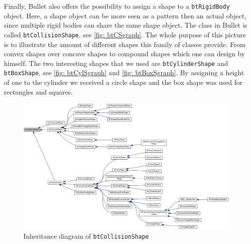 Finally, Bullet also offers the possibility to assign a shape to a \texttt{btRigidBody} object. Here, a shape object can be more seen as a pattern then an actual object, since multiple rigid bodies can share the same shape object. The class in Bullet is called \texttt{btCollisionShape}, see \autoref{fig: btCSgraph}. The whole purpose of this picture is to illustrate the amount of different shapes this family of classes provide. From convex shapes over concave shapes to compound shapes which one can design by himself. The two interesting shapes that we used are \texttt{btCylinderShape} and \texttt{btBoxShape}, see \autoref{fig: btCylSgraph} and \autoref{fig: btBoxSgraph}. By assigning a height of one to the cylinder we received a circle shape and the box shape was used for rectangles and squares.
\begin{figure}
\centering
\includegraphics[scale=0.2]{img/RigidBodies/btCollisionShapeGraph.png}
\caption{Inheritance diagram of \texttt{btCollisionShape}}
\label{fig: btCSgraph}
\end{figure}

